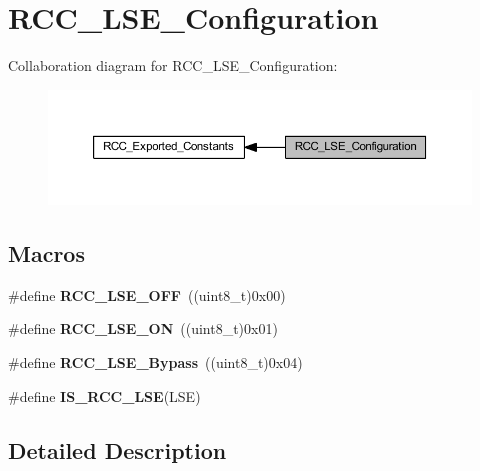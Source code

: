 \hypertarget{group___r_c_c___l_s_e___configuration}{}\section{R\+C\+C\+\_\+\+L\+S\+E\+\_\+\+Configuration}
\label{group___r_c_c___l_s_e___configuration}
Collaboration diagram for R\+C\+C\+\_\+\+L\+S\+E\+\_\+\+Configuration\+:\nopagebreak
\begin{figure}[H]
\begin{center}
\leavevmode
\includegraphics[width=350pt]{group___r_c_c___l_s_e___configuration}
\end{center}
\end{figure}
\subsection*{Macros}
\begin{DoxyCompactItemize}
\item 
\mbox{\label{group___r_c_c___l_s_e___configuration_ga6645c27708d0cad1a4ab61d2abb24c77}} 
\#define {\bfseries R\+C\+C\+\_\+\+L\+S\+E\+\_\+\+O\+FF}~((uint8\+\_\+t)0x00)
\item 
\mbox{\label{group___r_c_c___l_s_e___configuration_gac981ea636c2f215e4473901e0912f55a}} 
\#define {\bfseries R\+C\+C\+\_\+\+L\+S\+E\+\_\+\+ON}~((uint8\+\_\+t)0x01)
\item 
\mbox{\label{group___r_c_c___l_s_e___configuration_gac911af00bffa1bd1b1676f582a8a88e1}} 
\#define {\bfseries R\+C\+C\+\_\+\+L\+S\+E\+\_\+\+Bypass}~((uint8\+\_\+t)0x04)
\item 
\#define {\bfseries I\+S\+\_\+\+R\+C\+C\+\_\+\+L\+SE}(L\+SE)
\end{DoxyCompactItemize}


\subsection{Detailed Description}


